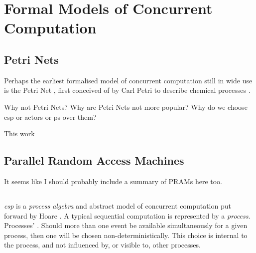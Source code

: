 \section{Formal Models of Concurrent Computation}

\subsection{Petri Nets}
Perhaps the earliest formalised model of concurrent computation still in wide use is the Petri Net \cite{Dennis2011}, first conceived of by Carl Petri to describe chemical processes \cite{Petri2008}.

\begin{anfxerror}{Why not Petri Nets?}
Why are Petri Nets not more popular?  Why do we choose \Gls{csp} or \Glspl{actor} or \Gls{ps} over them?
\end{anfxerror}

\cite{Varela2013}

This work 

\subsection{Parallel Random Access Machines}
It seems like I should probably include a summary of PRAMs here too.


\subsection{\label{subsec:lr:csp}}

\emph{\Gls{csp}} is a \emph{process algebra} and abstract model of concurrent computation put forward by Hoare \cite{Hoare1985,Roscoe2011}.  A typical sequential computation is represented by a \emph{process}.  Processes' .  Should more than one event be available simultaneously for a given process, then one will be chosen non-deterministically.  This choice is internal to the process, and not influenced by, or visible to, other processes.

